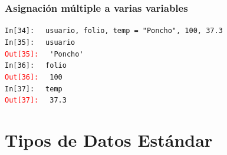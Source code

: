 {\begin{frame}[fragile]
\frametitle{Asignación múltiple a varias variables}
\textcolor{ao}{\texttt{In[34]: }} \verb| usuario, folio, temp = "Poncho", 100, 37.3 | \\
\pause
\textcolor{ao}{\texttt{In[35]: }} \verb| usuario | \\
\pause
\textcolor{red}{\texttt{Out[35]: }} \verb| 'Poncho'| \\
\pause
\textcolor{ao}{\texttt{In[36]: }} \verb| folio | \\
\pause
\textcolor{red}{\texttt{Out[36]: }} \verb| 100| \\
\pause
\textcolor{ao}{\texttt{In[37]: }} \verb| temp| \\
\pause
\textcolor{red}{\texttt{Out[37]: }} \verb| 37.3|
\end{frame}
\section{Tipos de Datos Estándar}
}
